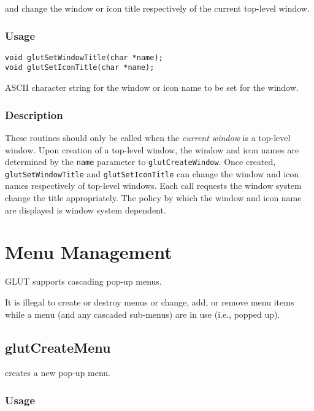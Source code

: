  and  change
the window or icon title respectively of the current top-level window.

\subsubsection*{Usage}
\begin{verbatim}
void glutSetWindowTitle(char *name);
void glutSetIconTitle(char *name);
\end{verbatim}
\begin{description}
\itemsep 0in
\item[\tt name]
ASCII character string for the window or icon name to be set for the window.
\end{description}

\subsubsection*{Description}

These routines should only be called when the {\em current window}
is a top-level window.  Upon creation of a top-level window,
the window and icon names are determined by the {\tt name}
parameter to {\tt glutCreateWindow}.  Once created, {\tt glutSetWindowTitle}
and {\tt glutSetIconTitle} can change the window and icon names
respectively of top-level windows.  Each call requests the
window system change the title appropriately.  The policy by which
the window and icon name are displayed is window system dependent.

\section{Menu Management}

GLUT supports cascading pop-up menus.

It is illegal to create or destroy menus or change, add, or remove menu items while a
menu (and any cascaded sub-menus) are in use (i.e., popped up).

\subsection{glutCreateMenu}

 creates a new pop-up menu.

\subsubsection*{Usage}

